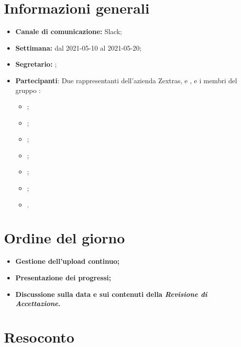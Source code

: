 \section{Informazioni generali}

\begin{itemize}

    \item \textbf{Canale di comunicazione:} Slack;

    \item \textbf{Settimana:} dal 2021-05-10 al 2021-05-20;

    \item \textbf{Segretario:} \ACapoRedazione{};

    \item \textbf{Partecipanti}: Due rappresentanti dell'azienda Zextras, \textit{\Alessio{}} e \textit{\Federico{}}, e i membri del gruppo \Gruppo{}:
        \begin{itemize}
            \item \Daniele{};
            \item \Davide{};
            \item \Francesco{};
            \item \Tommaso{};
            \item \Lucrezia{};
            \item \Matteo{};
            \item \Giosue{}.
        \end{itemize}
\end{itemize}

\section{Ordine del giorno}

\begin{itemize}
    \item\textbf{Gestione dell'upload continuo;}
    \item\textbf{Presentazione dei progressi;}
    \item\textbf{Discussione sulla data e sui contenuti della \textit{Revisione di Accettazione}.}
\end{itemize}
\newpage


\section{Resoconto}
